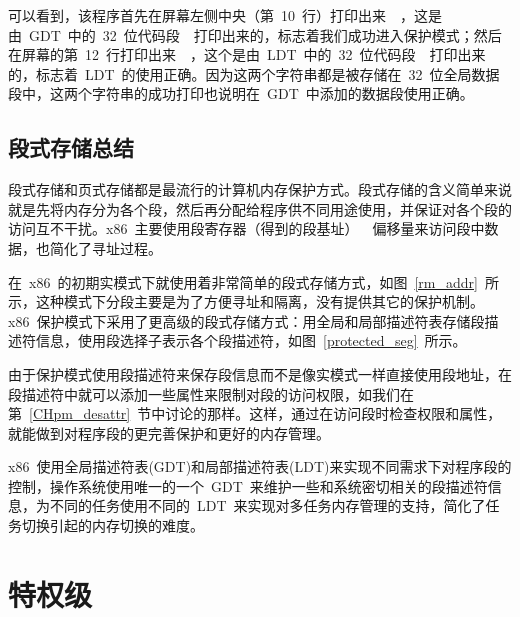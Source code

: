 可以看到，该程序首先在屏幕左侧中央（第~10~行）打印出来~~，这是由~GDT~中的~32~位代码段~~打印出来的，标志着我们成功进入保护模式；然后在屏幕的第~12~行打印出来~~，这个是由~LDT~中的~32~位代码段~~打印出来的，标志着~LDT~的使用正确。因为这两个字符串都是被存储在~32~位全局数据段中，这两个字符串的成功打印也说明在~GDT~中添加的数据段使用正确。

\subsection{段式存储总结}

段式存储和页式存储都是最流行的计算机内存保护方式。段式存储的含义简单来说就是先将内存分为各个段，然后再分配给程序供不同用途使用，并保证对各个段的访问互不干扰。x86~主要使用段寄存器（得到的段基址）~\code{+}~偏移量来访问段中数据，也简化了寻址过程。

在~x86~的初期实模式下就使用着非常简单的段式存储方式，如图~\ref{rm_addr}~所示，这种模式下分段主要是为了方便寻址和隔离，没有提供其它的保护机制。x86~保护模式下采用了更高级的段式存储方式：用全局和局部描述符表存储段描述符信息，使用段选择子表示各个段描述符，如图~\ref{protected_seg}~所示。

由于保护模式使用段描述符来保存段信息而不是像实模式一样直接使用段地址，在段描述符中就可以添加一些属性来限制对段的访问权限，如我们在第~\ref{CHpm_desattr}~节中讨论的那样。这样，通过在访问段时检查权限和属性，就能做到对程序段的更完善保护和更好的内存管理。

x86~使用全局描述符表(GDT)和局部描述符表(LDT)来实现不同需求下对程序段的控制，操作系统使用唯一的一个~GDT~来维护一些和系统密切相关的段描述符信息，为不同的任务使用不同的~LDT~来实现对多任务内存管理的支持，简化了任务切换引起的内存切换的难度。

\section{特权级}

